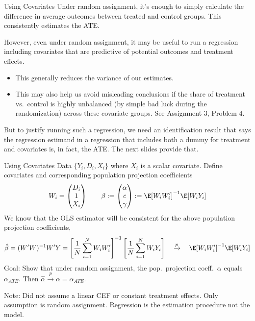 \documentclass[aspectratio=169, handout]{beamer}
\newcommand{\pto}{\xrightarrow{p}}
\newcommand{\sumiN}{\sum^N_{i=1}}
\begin{document}
{\footnotesize
\begin{frame}{Using Covariates}
Under random assignment, it's enough to simply calculate the difference
in average outcomes between treated and control groups.
This consistently estimates the ATE.

However, even under random assignment, it may be useful to run a
regression including covariates that are predictive of potential
outcomes and treatment effects.
\begin{itemize}
  \item This generally reduces the variance of our estimates.
  \item This may also help us avoid misleading conclusions if the share
    of treatment vs.\ control is highly unbalanced (by simple bad luck
    during the randomization) across these covariate groups.
    See Assignment 3, Problem 4.
\end{itemize}
But to justify running such a regression, we need an identification
result that says the regression estimand in a regression that includes
both a dummy for treatment and covariates is, in fact, the ATE.
The next slides provide that.
\end{frame}
}

{\footnotesize
\begin{frame}{Using Covariates}
Data $\{Y_i,D_i,X_i\}$ where $X_i$ is a scalar covariate.
Define covariates and corresponding population projection coefficients
\begin{align*}
  W_i =
  \begin{pmatrix}
    D_i \\
    1 \\
    X_i
  \end{pmatrix}
  \qquad
  \beta
  :=
  \begin{pmatrix}
    \alpha \\
    c \\
    \gamma
  \end{pmatrix}
  :=
  \E[W_iW_i']^{-1}
  \E[W_iY_i]
\end{align*}
\pause
We know that the OLS estimator will be consistent
for the above population projection coefficients,
\begin{align*}
  \hat{\beta}
  =
  (W'W)^{-1}W'Y
  =
  \left[
    \frac{1}{N}
    \sumiN
    W_iW_i'
  \right]^{-1}
  \left[
    \frac{1}{N}
    \sumiN
    W_iY_i
  \right]
  \quad\pto\quad
  \E[W_iW_i']^{-1}
  \E[W_iY_i]
\end{align*}
\pause
\alert{Goal}:
Show that under random assignment,
the pop.\ projection coeff.\ $\alpha$ equals $\alpha_{ATE}$.  Then
$\hat{\alpha}\pto \alpha=\alpha_{ATE}$.

\pause
\alert{Note}:
Did \alert{not} assume a linear CEF or constant treatment effects.
Only assumption is random assignment.
Regression is the estimation \alert{procedure} not the \alert{model}.
\end{frame}
}
\end{document}
